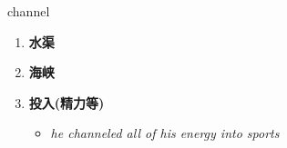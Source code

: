 
\begin{frame}
{\huge channel}
\begin{center}
\begin{enumerate}\Large
  \item \textbf{水渠}
  \item \textbf{海峡}
  \item \textbf{投入(精力等)}
  \begin{itemize}
    \item \em{\Large{he channeled all of his energy into sports}}
  \end{itemize}
\end{enumerate}
\end{center}
\end{frame}
